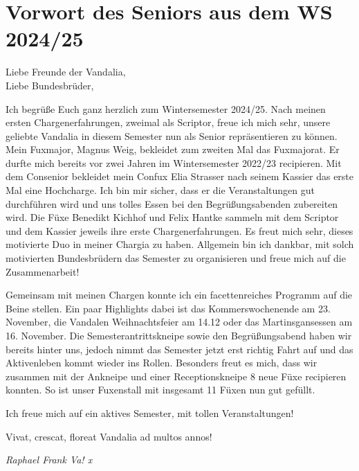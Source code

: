 \section{Vorwort des Seniors aus dem WS 2024/25}

Liebe Freunde der Vandalia,\\
Liebe Bundesbrüder, 

\begin{paracol}{2}
\switchcolumn[0] %

Ich begrüße Euch ganz herzlich zum Wintersemester 2024/25. Nach meinen ersten Chargenerfahrungen, zweimal als Scriptor, freue ich mich sehr, unsere geliebte Vandalia in diesem Semester nun als Senior repräsentieren zu können. Mein Fuxmajor, Magnus Weig, bekleidet zum zweiten Mal das Fuxmajorat. Er durfte mich bereits vor zwei Jahren im Wintersemester 2022/23 recipieren. Mit dem Consenior bekleidet mein Confux Elia Strasser nach seinem Kassier das erste Mal eine Hochcharge. Ich bin mir sicher, dass er die Veranstaltungen gut durchführen wird und uns tolles Essen bei den Begrüßungsabenden zubereiten wird. Die Füxe Benedikt Kichhof und Felix Hantke sammeln mit dem Scriptor und dem Kassier jeweils ihre erste Chargenerfahrungen. Es freut mich sehr, dieses motivierte Duo in meiner Chargia zu haben. Allgemein bin ich dankbar, mit solch motivierten Bundesbrüdern das Semester zu organisieren und freue mich auf die Zusammenarbeit!

\switchcolumn[1] %

Gemeinsam mit meinen Chargen konnte ich ein facettenreiches Programm auf die Beine stellen. Ein paar Highlights dabei ist das Kommerswochenende am 23. November, die Vandalen Weihnachtsfeier am 14.12 oder das Martinsgansessen am 16. November. Die Semesterantrittskneipe sowie den Begrüßungsabend haben wir bereits hinter uns, jedoch nimmt das Semester jetzt erst richtig Fahrt auf und das Aktivenleben kommt wieder ins Rollen. Besonders freut es mich, dass wir zusammen mit der Ankneipe und einer Receptionskneipe 8 neue Füxe recipieren konnten. So ist unser Fuxenstall mit insgesamt 11 Füxen nun gut gefüllt.

Ich freue mich auf ein aktives Semester, mit tollen Veranstaltungen!

Vivat, crescat, floreat Vandalia ad multos annos!
	\begin{flushright}
		\hfill\emph{Raphael Frank Va! x}
	\end{flushright}
\end{paracol}

\clearpage